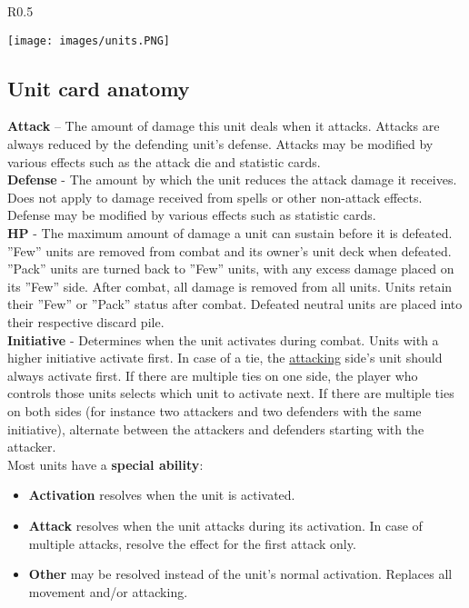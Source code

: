 \documentclass[12pt]{article}
\begin{document}
\clearpage
\begin{wrapfigure}{R}{0.5\textwidth}
    \begin{center}
    \texttt{[image: images/units.PNG]}
    \end{center}
\end{wrapfigure}
\subsection*{Unit card anatomy}
\textbf{Attack} – The amount of damage this unit deals when it attacks. Attacks are always reduced by the defending unit’s defense. Attacks may be modified by various effects such as the attack die and statistic cards.\\[6pt]
\textbf{Defense} - The amount by which the unit reduces the attack damage it receives. Does not apply to damage received from spells or other non-attack effects. Defense may be modified by various effects such as statistic cards.\\[6pt]
\textbf{\hypertarget{HP}{HP}} - The maximum amount of damage a unit can sustain before it is defeated. ”Few” units are removed from combat and its owner’s unit deck when defeated. ”Pack” units are turned back to ”Few” units, with any excess damage placed on its ”Few” side. After combat, all damage is removed from all units. Units retain their ”Few” or ”Pack” status after combat. Defeated neutral units are placed into their respective discard pile.\\[6pt]
{\hypertarget{Initiative}{\textbf{Initiative}}} - Determines when the unit activates during combat. Units with a higher initiative activate first. In case of a tie, the \hyperlink{Combatterminology}{attacking} side’s unit should always activate first. If there are multiple ties on one side, the player who controls those units selects which unit to activate next. If there are multiple ties on both sides (for instance two attackers and two defenders with the same initiative), alternate between the attackers and defenders starting with the attacker.\\[6pt]
Most units have a \textbf{special ability}:\\[6pt]
  \begin{minipage}{.6\textwidth}
    \begin{itemize}[wide]
      \item\textbf{Activation}  resolves when the unit is activated.
      \item\textbf{Attack}  resolves when the unit attacks during its activation. In case of multiple attacks, resolve the effect for the first attack only.
      \item\textbf{Other}  may be resolved instead of the unit's normal activation. Replaces all movement and/or attacking.
    \end{itemize}
  \end{minipage}
\end{document}
